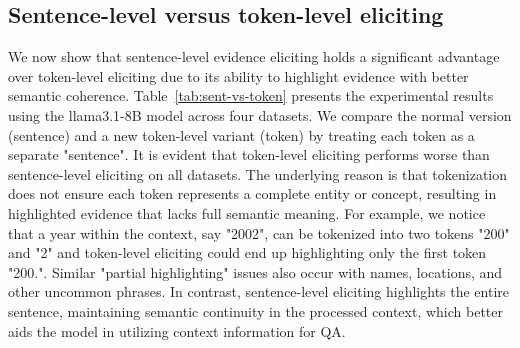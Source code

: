 \subsection{Sentence-level versus token-level eliciting}\label{sec:apd-res-token}
We now show that sentence-level evidence eliciting holds a significant advantage over token-level eliciting due to its ability to highlight evidence with better semantic coherence. 
Table~\ref{tab:sent-vs-token} presents the experimental results using the llama3.1-8B model across four datasets.
We compare the normal version \se (sentence) and a new token-level variant \se (token) by treating each token as a separate "sentence".
It is evident that token-level eliciting performs worse than sentence-level eliciting on all datasets. 
The underlying reason is that tokenization does not ensure each token represents a complete entity or concept, resulting in highlighted evidence that lacks full semantic meaning.
For example, we notice that a year within the context, say "2002", can be tokenized into two tokens "200" and "2" and token-level eliciting could end up highlighting only the first token "200.".
Similar "partial highlighting" issues also occur with names, locations, and other uncommon phrases. 
In contrast, sentence-level eliciting highlights the entire sentence, maintaining semantic continuity in the processed context, which better aids the model in utilizing context information for QA.


